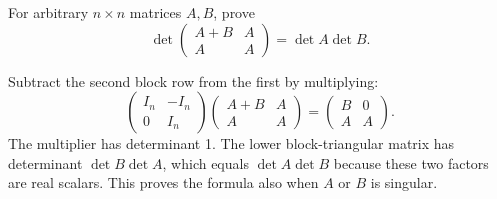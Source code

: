 \begin{problem}\label{ex:05:block-sum}
For arbitrary \(n\times n\) matrices \(A,B\), prove
\[
\det\begin{pmatrix}A+B&A\\A&A\end{pmatrix}=\det A\det B.
\]
\end{problem}
\begin{solution}
Subtract the second block row from the first by multiplying:
\[
\begin{pmatrix}I_n&-I_n\\0&I_n\end{pmatrix}
\begin{pmatrix}A+B&A\\A&A\end{pmatrix}
=\begin{pmatrix}B&0\\A&A\end{pmatrix}.
\]
The multiplier has determinant 1. The lower block-triangular matrix has
determinant \(\det B\det A\), which equals \(\det A\det B\) because
these two factors are real scalars. This proves the formula also when
\(A\) or \(B\) is singular.
\end{solution}

